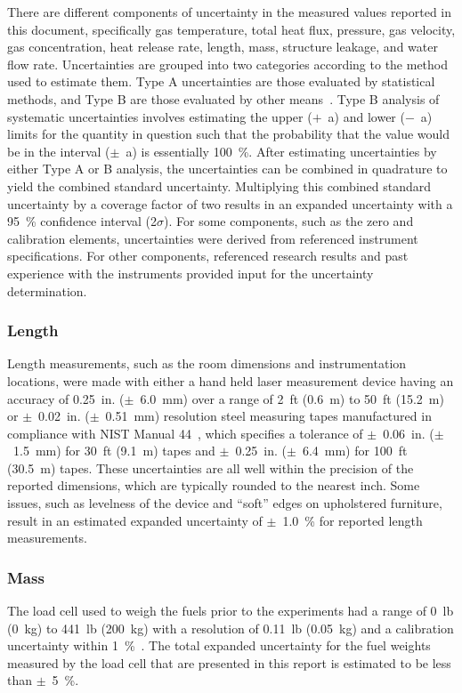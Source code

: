 \documentclass[12pt,oneside]{book}
\begin{document}
There are different components of uncertainty in the measured values reported in this document, specifically gas temperature, total heat flux, pressure, gas velocity, gas concentration, heat release rate, length, mass, structure leakage, and water flow rate. Uncertainties are grouped into two categories according to the method used to estimate them. Type A uncertainties are those evaluated by statistical methods, and Type B are those evaluated by other means~\cite{Taylor&Kuyatt:1994}. Type B analysis of systematic uncertainties involves estimating the upper ($+$~a) and lower ($-$~a) limits for the quantity in question such that the probability that the value would be in the interval ($\pm$~a) is essentially 100~\%. After estimating uncertainties by either Type A or B analysis, the uncertainties can be combined in quadrature to yield the combined standard uncertainty. Multiplying this combined standard uncertainty by a coverage factor of two results in an expanded uncertainty with a 95~\% confidence interval (2$\sigma$). For some components, such as the zero and calibration elements, uncertainties were derived from referenced instrument specifications. For other components, referenced research results and past experience with the instruments provided input for the uncertainty determination.

\subsubsection*{Length}
Length measurements, such as the room dimensions and instrumentation locations, were made with either a hand held laser measurement device having an accuracy of 0.25~in. ($\pm$~6.0~mm) over a range of 2~ft (0.6~m) to 50~ft (15.2~m)~\cite{StanleyTools} or $\pm$~0.02~in. ($\pm$~0.51~mm) resolution steel measuring tapes manufactured in compliance with NIST Manual 44~\cite{Butcher:2012}, which specifies a tolerance of $\pm$~0.06~in. ($\pm$~1.5~mm) for 30~ft (9.1~m) tapes and $\pm$~0.25~in. ($\pm$~6.4~mm) for 100~ft (30.5~m) tapes. These uncertainties are all well within the precision of the reported dimensions, which are typically rounded to the nearest inch. Some issues, such as levelness of the device and ``soft'' edges on upholstered furniture, result in an estimated expanded uncertainty of $\pm$~1.0~\% for reported length measurements.

\subsubsection*{Mass}
The load cell used to weigh the fuels prior to the experiments had a range of 0~lb (0~kg) to 441~lb (200~kg) with a resolution of 0.11~lb (0.05~kg) and a calibration uncertainty within 1~\%~\cite{Ohaus:2000}. The total expanded uncertainty for the fuel weights measured by the load cell that are presented in this report is estimated to be less than $\pm$~5~\%.
\end{document}

